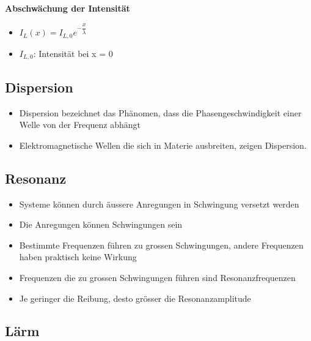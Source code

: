 \documentclass[8pt,a4paper]{scrartcl}
\begin{document}
\begin{multicols*}{3}
							\textbf{Abschwächung der Intensität}
							\begin{itemize}\itemsep0pt
								\item $I_{L}(x)=I_{L,0}e^{-\dfrac{x}{\lambda}}$ 
								\item $I_{L,0}$: Intensität bei x = 0
							\end{itemize}	
						
						\subsection{Dispersion}		
							\begin{itemize}\itemsep0pt
								\item Dispersion bezeichnet das Phänomen, dass die Phasengeschwindigkeit einer Welle von der Frequenz abhängt
								\item Elektromagnetische Wellen die sich in Materie ausbreiten, zeigen Dispersion.
							\end{itemize}	

						\subsection{Resonanz}		
							\begin{itemize}\itemsep0pt
								\item Systeme können durch äussere Anregungen in Schwingung versetzt werden
								\item Die Anregungen können Schwingungen sein
								\item Bestimmte Frequenzen führen zu grossen Schwingungen, andere Frequenzen haben praktisch keine Wirkung
								\item Frequenzen die zu grossen Schwingungen führen sind Resonanzfrequenzen
								\item Je geringer die Reibung, desto grösser die Resonanzamplitude
								
							\end{itemize}	
						\subsection{Lärm}	

\end{multicols*}
\end{document}
